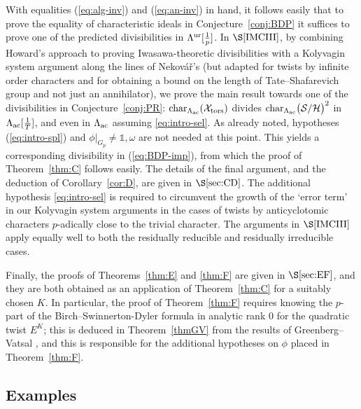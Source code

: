 \documentclass[10pt]{amsart}
\numberwithin{equation}{section}
\theoremstyle{definition}
\theoremstyle{remark}
\begin{document}
With equalities (\ref{eq:alg-inv}) and (\ref{eq:an-inv}) in hand, 
it follows easily that to prove  the equality of characteristic ideals in Conjecture~\ref{conj:BDP} it suffices to prove one of the predicted divisibilities in $\Lambda^{\rm ur}[\frac{1}{p}]$. In $\S\ref{IMCIII}$,
{by combining Howard's approach to proving Iwasawa-theoretic divisibilities \cite{howard} with a Kolyvagin system argument along the lines of 
Nekov\'a\v{r}'s \cite{nekovar} (but adapted for twists by infinite order characters and for obtaining a bound on the length of Tate--Shafarevich group and not just an annihilator),}
we prove the main result towards one of the divisibilities in Conjecture~\ref{conj:PR}: 
{${\rm char}_{\Lambda_{\rm ac}}(\mathcal{X}_{\rm tors})$ divides ${\rm char}_{\Lambda_{\rm ac}}\bigl(\mathcal{S}/\mathcal{H}\bigr)^2$ in 
$\Lambda_{\rm ac}[\frac{1}{T}]$, and even in 
$\Lambda_{\rm ac}$ assuming \eqref{eq:intro-sel}.} As already noted, hypotheses (\ref{eq:intro-spl}) and $\phi\vert_{G_p}\neq\mathds{1},\omega$ are not needed at this point. 
This yields a corresponding divisibility in (\ref{eq:BDP-imp}), from which the proof of Theorem~\ref{thm:C} follows easily. The details of the final argument, and the deduction of Corollary~\ref{cor:D}, are given in $\S\ref{sec:CD}$.
The additional hypothesis \eqref{eq:intro-sel} is required to circumvent the growth of the
`error term' in our 
Kolyvagin system arguments in the cases of twists by anticyclotomic characters 
$p$-adically close to the trivial character. {The arguments in $\S\ref{IMCIII}$ apply equally well to both the residually reducible and residually irreducible cases.}

Finally, the proofs of Theorems~\ref{thm:E} and \ref{thm:F} are given in $\S\ref{sec:EF}$, %
and they are both obtained as an application of Theorem~\ref{thm:C} for a suitably chosen $K$. In particular, the proof of Theorem~\ref{thm:F} requires knowing the $p$-part of the Birch--Swinnerton-Dyler formula in analytic rank $0$
for the quadratic twist $E^K$; this is deduced in Theorem~\ref{thmGV} from the results of Greenberg--Vatsal \cite{greenvats}, and this is responsible for the additional hypotheses on $\phi$ placed in Theorem~\ref{thm:F}. 


\subsection{Examples}
\end{document}
